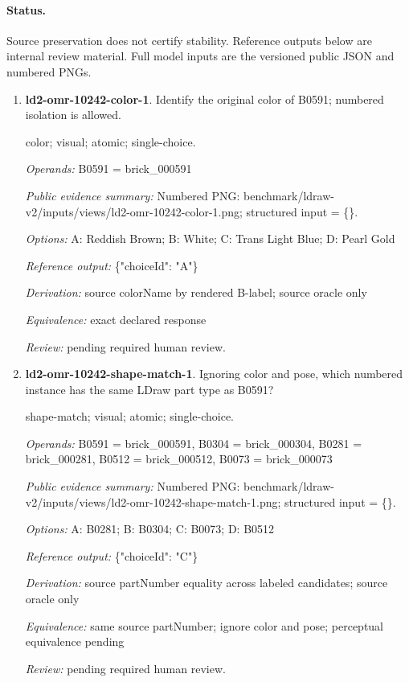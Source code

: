 \paragraph{Status.}Source preservation does not certify stability. Reference outputs below are internal review material. Full model inputs are the versioned public JSON and numbered PNGs.
\begin{enumerate}
\item \textbf{ld2-omr-10242-color-1}. Identify the original color of B0591; numbered isolation is allowed.
\par{\small color; visual; atomic; single-choice.\par\textit{Operands:} B0591 = brick\_000591\par\textit{Public evidence summary:} Numbered PNG: benchmark/ldraw-v2/inputs/views/ld2-omr-10242-color-1.png; structured input = \{\}.\par\textit{Options:} A: Reddish Brown; B: White; C: Trans Light Blue; D: Pearl Gold\par\textit{Reference output:} \{"choiceId": "A"\}\par\textit{Derivation:} source colorName by rendered B-label; source oracle only\par\textit{Equivalence:} exact declared response\par\textit{Review:} pending required human review.}
\item \textbf{ld2-omr-10242-shape-match-1}. Ignoring color and pose, which numbered instance has the same LDraw part type as B0591?
\par{\small shape-match; visual; atomic; single-choice.\par\textit{Operands:} B0591 = brick\_000591, B0304 = brick\_000304, B0281 = brick\_000281, B0512 = brick\_000512, B0073 = brick\_000073\par\textit{Public evidence summary:} Numbered PNG: benchmark/ldraw-v2/inputs/views/ld2-omr-10242-shape-match-1.png; structured input = \{\}.\par\textit{Options:} A: B0281; B: B0304; C: B0073; D: B0512\par\textit{Reference output:} \{"choiceId": "C"\}\par\textit{Derivation:} source partNumber equality across labeled candidates; source oracle only\par\textit{Equivalence:} same source partNumber; ignore color and pose; perceptual equivalence pending\par\textit{Review:} pending required human review.}

\end{enumerate}
